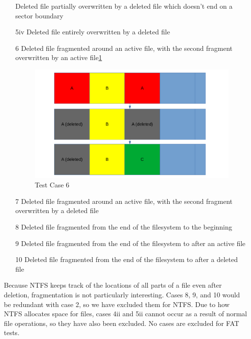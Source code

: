 \begin{itemize}
 Deleted file partially overwritten by a deleted file which doesn't end on a sector boundary
    \item [5iv]
 Deleted file entirely overwritten by a deleted file
    \item [6]
 Deleted file fragmented around an active file, with the second fragment overwritten by an active file\ref{fig:case_6}
    \begin{figure}[h]
        \centering
        \includegraphics[width=\linewidth]{fig/case6.png}
        \caption{Test Case 6}
        \label{fig:case_6}
    \end{figure}
    \item [7]
 Deleted file fragmented around an active file, with the second fragment overwritten by a deleted file
    \item [8]
 Deleted file fragmented from the end of the filesystem to the beginning
    \item [9]
 Deleted file fragmented from the end of the filesystem to after an active file
    \item [10]
 Deleted file fragmented from the end of the filesystem to after a deleted file
\end{itemize}

Because NTFS keeps track of the locations of all parts of a file even after deletion, fragmentation is not particularly interesting. Cases 8, 9, and 10 would be redundant with case 2, so we have excluded them for NTFS. Due to how NTFS allocates space for files, cases 4ii and 5ii cannot occur as a result of normal file operations, so they have also been excluded. No cases are excluded for FAT tests.

